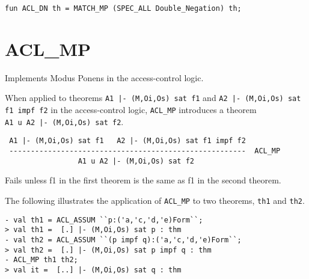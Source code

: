\IMPLEMENTATION
\begin{holboxed}
\begin{verbatim}
fun ACL_DN th = MATCH_MP (SPEC_ALL Double_Negation) th;
\end{verbatim}
\end{holboxed}

\ENDDOC
  
\section{ACL\_MP}



\egroup

\SYNOPSIS
Implements Modus Ponens in the access-control logic.

\DESCRIBE
When applied to theorems \texttt{A1 |- (M,Oi,Os) sat f1} and
\texttt{A2 |- (M,Oi,Os) sat f1 impf f2} in the access-control logic,
\texttt{ACL_MP} introduces a theorem\\ \texttt{A1 u A2 |- (M,Oi,Os) sat
  f2}.

\begin{verbatim}
 A1 |- (M,Oi,Os) sat f1   A2 |- (M,Oi,Os) sat f1 impf f2
 -------------------------------------------------------  ACL_MP
                 A1 u A2 |- (M,Oi,Os) sat f2
\end{verbatim}

\FAILURE 
Fails unless f1 in the first theorem is the same as f1 in the
second theorem.  

\EXAMPLE
The following illustrates the application of \texttt{ACL\_MP} to two
theorems, \texttt{th1} and \texttt{th2}.
\begin{holboxed}
\begin{verbatim}
- val th1 = ACL_ASSUM ``p:('a,'c,'d,'e)Form``;
> val th1 =  [.] |- (M,Oi,Os) sat p : thm
- val th2 = ACL_ASSUM ``(p impf q):('a,'c,'d,'e)Form``;
> val th2 =  [.] |- (M,Oi,Os) sat p impf q : thm
- ACL_MP th1 th2;
> val it =  [..] |- (M,Oi,Os) sat q : thm
\end{verbatim}
\end{holboxed}


